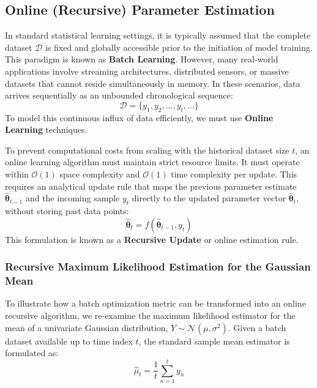 \documentclass{article}
\begin{document}
\subsection{Online (Recursive) Parameter Estimation}

In standard statistical learning settings, it is typically assumed that the complete dataset $\mathcal{D}$ is fixed and globally accessible prior to the initiation of model training. This paradigm is known as \textbf{Batch Learning}. However, many real-world applications involve streaming architectures, distributed sensors, or massive datasets that cannot reside simultaneously in memory. In these scenarios, data arrives sequentially as an unbounded chronological sequence:
\begin{equation}
\mathcal{D} = \{y_1, y_2, \dots, y_t, \dots\}
\end{equation}
To model this continuous influx of data efficiently, we must use \textbf{Online Learning} techniques.

To prevent computational costs from scaling with the historical dataset size $t$, an online learning algorithm must maintain strict resource limits. It must operate within $\mathcal{O}(1)$ space complexity and $\mathcal{O}(1)$ time complexity per update. This requires an analytical update rule that maps the previous parameter estimate $\hat{\boldsymbol{\theta}}_{t-1}$ and the incoming sample $y_t$ directly to the updated parameter vector $\hat{\boldsymbol{\theta}}_t$, without storing past data points:
\begin{equation}
\hat{\boldsymbol{\theta}}_t = f\left(\hat{\boldsymbol{\theta}}_{t-1}, y_t\right)
\end{equation}
This formulation is known as a \textbf{Recursive Update} or online estimation rule.

\subsubsection{Recursive Maximum Likelihood Estimation for the Gaussian Mean}

To illustrate how a batch optimization metric can be transformed into an online recursive algorithm, we re-examine the maximum likelihood estimator for the mean of a univariate Gaussian distribution, $Y \sim \mathcal{N}(\mu, \sigma^2)$. Given a batch dataset available up to time index $t$, the standard sample mean estimator is formulated as:
\begin{equation}
\hat{\mu}_t = \frac{1}{t} \sum_{n=1}^t y_n
\end{equation}
\end{document}
